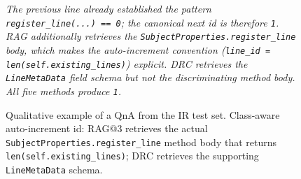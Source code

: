 \documentclass{llmxive}
\begin{document}
\begin{figure}[!htbp]
\begin{center}
\begin{tcolorbox}
\vspace{1pt}
{\footnotesize\itshape
The previous line already established the pattern \texttt{register\_line(...) == 0}; the canonical next id is therefore \texttt{1}. RAG additionally retrieves the \texttt{SubjectProperties.register\_line} body, which makes the auto-increment convention (\texttt{line\_id = len(self.existing\_lines)}) explicit. DRC retrieves the \texttt{LineMetaData} field schema but not the discriminating method body. All five methods produce \texttt{1}.
}

\end{tcolorbox}
\caption{Qualitative example of a QnA from the IR test set. Class-aware auto-increment id: RAG@3 retrieves the actual \texttt{SubjectProperties.register\_line} method body that returns \texttt{len(self.existing\_lines)}; DRC retrieves the supporting \texttt{LineMetaData} schema.}
\label{fig:qualitative_ir_pynguin_68}
\end{center}
\end{figure}
\end{document}
